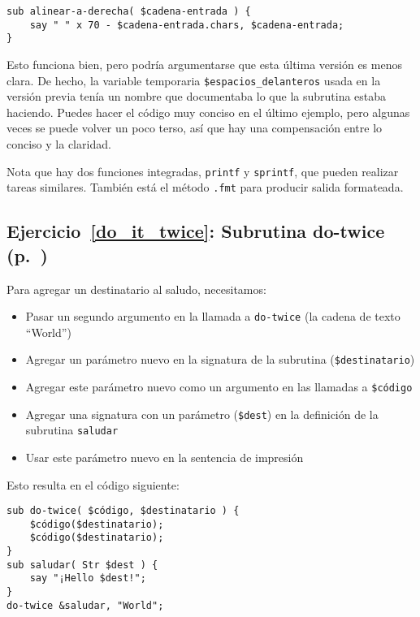 \begin{verbatim}
sub alinear-a-derecha( $cadena-entrada ) {
    say " " x 70 - $cadena-entrada.chars, $cadena-entrada;
}
\end{verbatim}

Esto funciona bien, pero podría argumentarse que esta última
versión es menos clara. De hecho, la variable temporaria
\verb|$espacios_delanteros| usada en la versión previa tenía 
un nombre que documentaba lo que la subrutina estaba haciendo.
Puedes hacer el código muy conciso en el último ejemplo, 
pero algunas veces se puede volver un poco terso, así que 
hay una compensación entre lo conciso y la claridad.

Nota que hay dos funciones integradas, {\tt printf} y 
{\tt sprintf}, que pueden realizar tareas similares. También
está el método \verb|.fmt| para producir salida formateada.


\subsection{Ejercicio~\ref{do_it_twice}: Subrutina do-twice (p.~\pageref{do_it_twice})}
\label{sol_do_it_twice}

Para agregar un destinatario al saludo, necesitamos:
\begin{itemize}
\item Pasar un segundo argumento en la llamada a  
{\tt do-twice} (la cadena de texto ``World'')
\item Agregar un parámetro nuevo en la signatura de la subrutina
(\verb|$destinatario|)
\item Agregar este parámetro nuevo como un argumento en las llamadas
a \verb|$código|
\item Agregar una signatura con un parámetro (\verb|$dest|) en la definición de la
subrutina {\tt saludar}
\item Usar este parámetro nuevo en la sentencia de impresión
\end{itemize} 

Esto resulta en el código siguiente:

\begin{verbatim}
sub do-twice( $código, $destinatario ) {
    $código($destinatario); 
   	$código($destinatario);
}
sub saludar( Str $dest ) {
    say "¡Hello $dest!";
}
do-twice &saludar, "World";
\end{verbatim}

